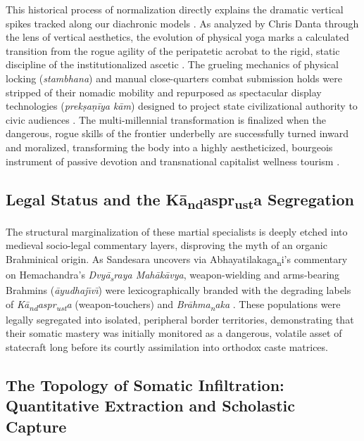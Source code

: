 \documentclass[11pt,twoside,letterpaper]{article}
\begin{document}
This historical process of normalization directly explains the dramatic vertical spikes tracked along our diachronic models \cite{McCartney2026b}. As analyzed by Chris Danta through the lens of vertical aesthetics, the evolution of physical yoga marks a calculated transition from the rogue agility of the peripatetic acrobat to the rigid, static discipline of the institutionalized ascetic \cite{Danta2015}. The grueling mechanics of physical locking (\textit{stambhana}) and manual close-quarters combat submission holds were stripped of their nomadic mobility and repurposed as spectacular display technologies (\textit{prekṣaṇīya kām}) designed to project state civilizational authority to civic audiences \cite{Danta2015, McCartney2026b}. The multi-millennial transformation is finalized when the dangerous, rogue skills of the frontier underbelly are successfully turned inward and moralized, transforming the body into a highly aestheticized, bourgeois instrument of passive devotion and transnational capitalist wellness tourism \cite{McCartney2021, Srinivas2012}.

\subsection{Legal Status and the K\={a}\textsubscript{n}\textsubscript{d}aspr\textsubscript{u}\textsubscript{s}\textsubscript{t}a Segregation}
The structural marginalization of these martial specialists is deeply etched into medieval socio-legal commentary layers, disproving the myth of an organic Brahminical origin. As Sandesara uncovers via Abhayatilakaga\textsubscript{n}i’s commentary on Hemachandra’s \textit{Dvy\={a}\textsubscript{s}raya Mah\={a}k\={a}vya}, weapon-wielding and arms-bearing Brahmins (\textit{\={a}yudhaj\={\i}v\={\i}}) were lexicographically branded with the degrading labels of \textit{K\={a}\textsubscript{n}\textsubscript{d}aspr\textsubscript{u}\textsubscript{s}\textsubscript{t}a} (weapon-touchers) and \textit{Br\={a}hma\textsubscript{n}aka} \cite{Sandesara1948}. These populations were legally segregated into isolated, peripheral border territories, demonstrating that their somatic mastery was initially monitored as a dangerous, volatile asset of statecraft long before its courtly assimilation into orthodox caste matrices.


\subsection{The Topology of Somatic Infiltration: Quantitative Extraction and Scholastic Capture}
\end{document}

